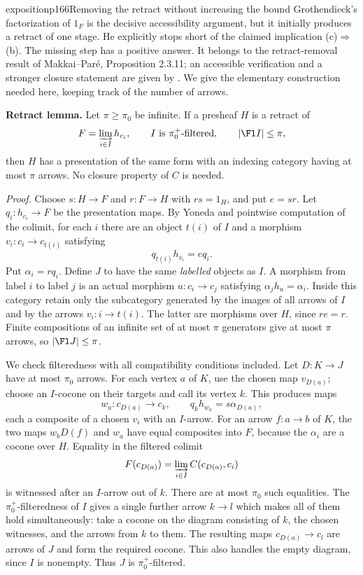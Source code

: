 \begin{dcomment}{exposition}{p166}{Removing the retract without increasing the bound}
Grothendieck's factorization of $1_F$ is the decisive accessibility argument, but it initially produces a retract of one stage. He explicitly stops short of the claimed implication (c)$\Rightarrow$(b). The missing step has a positive answer. It belongs to the retract-removal result of Makkai--Par\'e, Proposition 2.3.11; an accessible verification and a stronger closure statement are given by \citet[Corollaries 4.13 and 4.15, including footnote 2]{Chen2021Sifted}. We give the elementary construction needed here, keeping track of the number of arrows.

\textbf{Retract lemma.} Let $\pi\geq\pi_0$ be infinite. If a presheaf $H$ is a retract of
\[
 F=\varinjlim_{i\in I}h_{c_i},
 \qquad I\text{ is }\pi_0^+\text{-filtered},\qquad |\Fl I|\leq\pi,
\]
then $H$ has a presentation of the same form with an indexing category having at most $\pi$ arrows. No closure property of $C$ is needed.

\textit{Proof.} Choose $s:H\to F$ and $r:F\to H$ with $rs=1_H$, and put $e=sr$. Let $q_i:h_{c_i}\to F$ be the presentation maps. By Yoneda and pointwise computation of the colimit, for each $i$ there are an object $t(i)$ of $I$ and a morphism $v_i:c_i\to c_{t(i)}$ satisfying
\[
 q_{t(i)}h_{v_i}=e q_i.
\]
Put $\alpha_i=rq_i$. Define $J$ to have the same \emph{labelled} objects as $I$. A morphism from label $i$ to label $j$ is an actual morphism $u:c_i\to c_j$ satisfying $\alpha_jh_u=\alpha_i$. Inside this category retain only the subcategory generated by the images of all arrows of $I$ and by the arrows $v_i:i\to t(i)$. The latter are morphisms over $H$, since $re=r$. Finite compositions of an infinite set of at most $\pi$ generators give at most $\pi$ arrows, so $|\Fl J|\leq\pi$.

We check filteredness with all compatibility conditions included. Let $D:K\to J$ have at most $\pi_0$ arrows. For each vertex $a$ of $K$, use the chosen map $v_{D(a)}$; choose an $I$-cocone on their targets and call its vertex $k$. This produces maps
\[
 w_a:c_{D(a)}\longrightarrow c_k,
 \qquad q_kh_{w_a}=s\alpha_{D(a)},
\]
each a composite of a chosen $v_i$ with an $I$-arrow. For an arrow $f:a\to b$ of $K$, the two maps $w_bD(f)$ and $w_a$ have equal composites into $F$, because the $\alpha_i$ are a cocone over $H$. Equality in the filtered colimit
\[
 F(c_{D(a)})=\varinjlim_{i\in I}C(c_{D(a)},c_i)
\]
is witnessed after an $I$-arrow out of $k$. There are at most $\pi_0$ such equalities. The $\pi_0^+$-filteredness of $I$ gives a single further arrow $k\to l$ which makes all of them hold simultaneously: take a cocone on the diagram consisting of $k$, the chosen witnesses, and the arrows from $k$ to them. The resulting maps $c_{D(a)}\to c_l$ are arrows of $J$ and form the required cocone. This also handles the empty diagram, since $I$ is nonempty. Thus $J$ is $\pi_0^+$-filtered.


\end{dcomment}
